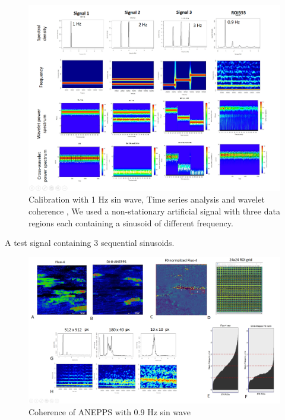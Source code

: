 \documentclass{biophys-new}
\begin{document}
\begin{figure}
    \includegraphics[width=0.9\linewidth]{fig5.png}
    \caption{Calibration with 1 Hz sin wave, Time series analysis and wavelet coherence , We used a non-stationary artificial signal with three data regions each containing a sinusoid of different frequency.}
    \label{fig:fig5}
\end{figure}

A test signal containing 3 sequential sinusoids.



\begin{figure}
    \includegraphics[width=0.9\linewidth]{fig6.png}
    \caption{Coherence of ANEPPS with 0.9 Hz sin wave }
    \label{fig:fig6}
\end{figure}
\end{document}
